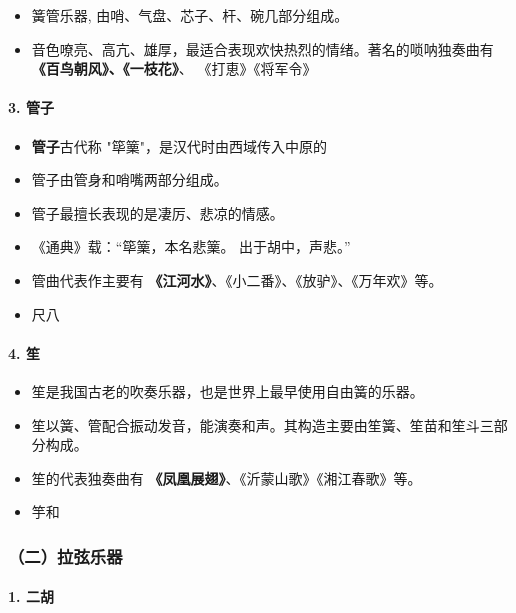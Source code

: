 \documentclass[
]{article}
\providecommand{\tightlist}{%
  \setlength{\itemsep}{0pt}\setlength{\parskip}{0pt}}
\begin{document}
\begin{itemize}
\tightlist
\item
  簧管乐器, 由哨、气盘、芯子、杆、碗几部分组成。
\item
  音色嘹亮、高亢、雄厚，最适合表现欢快热烈的情绪。著名的唢呐独奏曲有\textbf{《百鸟朝风》、《一枝花》}、
  《打恵》《将军令》
\end{itemize}

\paragraph{3. 管子}\label{ux7ba1ux5b50}

\begin{itemize}
\item
  \textbf{管子}古代称 "筚篥"，是汉代时由西域传入中原的
\item
  管子由管身和哨嘴两部分组成。
\item
  管子最擅长表现的是凄厉、悲凉的情感。
\item
  《通典》载：``筚篥，本名悲篥。 出于胡中，声悲。''
\item
  管曲代表作主要有
  \textbf{《江河水》}、《小二番》、《放驴》、《万年欢》等。
\item
  尺八
\end{itemize}

\paragraph{4. 笙}\label{ux7b19}

\begin{itemize}
\tightlist
\item
  笙是我国古老的吹奏乐器，也是世界上最早使用自由簧的乐器。
\item
  笙以簧、管配合振动发音，能演奏和声。其构造主要由笙簧、笙苗和笙斗三部分构成。
\item
  笙的代表独奏曲有 \textbf{《凤凰展翅》}、《沂蒙山歌》《湘江春歌》等。
\item
  竽和
\end{itemize}

\subsubsection{（二）拉弦乐器}\label{ux4e8cux62c9ux5f26ux4e50ux5668}

\paragraph{1. 二胡}\label{ux4e8cux80e1}
\end{document}
